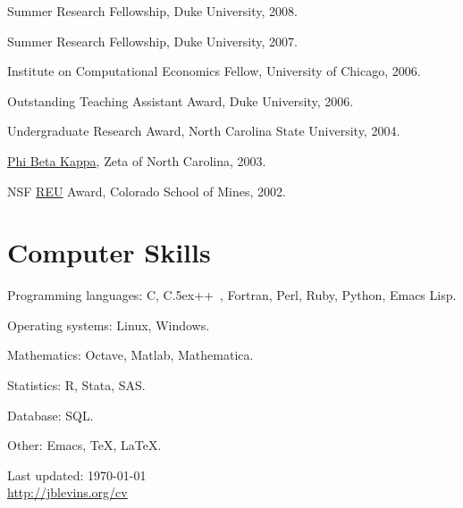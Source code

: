\documentclass[11pt,letterpaper]{article}
\renewenvironment{itemize}{
  \begin{list}{}
    { \setlength{\itemsep}{5pt}
      \setlength{\parsep}{0pt}
      \setlength{\topsep}{0pt}
      \setlength{\leftmargin}{0em} } }{
  \end{list}}
\def\Cplusplus{C{\raise.5ex\hbox{\footnotesize ++ }}}
\begin{document}
\begin{itemize}
\item Summer Research Fellowship, Duke University, 2008.
\item Summer Research Fellowship, Duke University, 2007.
\item Institute on Computational Economics Fellow, University of Chicago, 2006.
\item Outstanding Teaching Assistant Award, Duke University, 2006.
\item Undergraduate Research Award, North Carolina State University, 2004.
\item \href{http://www.pbk.org/}{Phi Beta Kappa}, Zeta of North Carolina, 2003.
\item NSF \href{http://www.nsf.gov/crssprgm/reu/}{REU} Award,
  Colorado School of Mines, 2002.
\end{itemize}

\section*{Computer Skills}

\begin{itemize}
\item Programming languages: C, \Cplusplus, Fortran, Perl, Ruby, Python,
  Emacs Lisp.
\item Operating systems: Linux, Windows.
\item Mathematics: Octave, Matlab, Mathematica.
\item Statistics: R, Stata, SAS.
\item Database: SQL.
\item Other: Emacs, \TeX, \LaTeX.
\end{itemize}

\bigskip

\begin{center}
\begin{footnotesize}
Last updated: \today \\
\href{http://jblevins.org/cv}{http://jblevins.org/cv}
\end{footnotesize}
\end{center}
\end{document}
